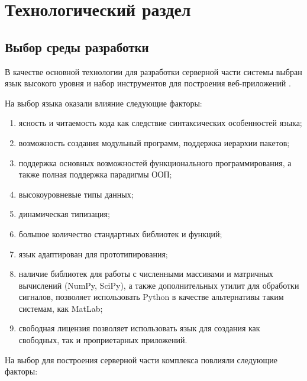 \chapter{Технологический раздел}
\section{Выбор среды разработки}

В качестве основной технологии для разработки серверной части системы выбран
язык высокого уровня  и набор инструментов для построения веб-приложений
.

На выбор языка оказали влияние следующие факторы:

\begin{enumerate}
\item ясность и читаемость кода как следствие синтаксических особенностей языка;
\item возможность создания модульный программ, поддержка иерархии пакетов;
\item поддержка основных возможностей функционального программирования, а также
полная поддержка парадигмы ООП;
\item высокоуровневые типы данных;
\item динамическая типизация;
\item большое количество стандартных библиотек и функций;
\item язык адаптирован для прототипирования;
\item наличие библиотек для работы с численными массивами и матричных вычислений
(NumPy, SciPy), а также дополнительных утилит для обработки сигналов, позволяет
использовать Python в качестве альтернативы таким системам, как MatLab;
\item свободная лицензия позволяет использовать язык для создания как свободных,
так и проприетарных приложений.
\end{enumerate}

На выбор  для построения серверной части комплекса повлияли
следующие факторы:

